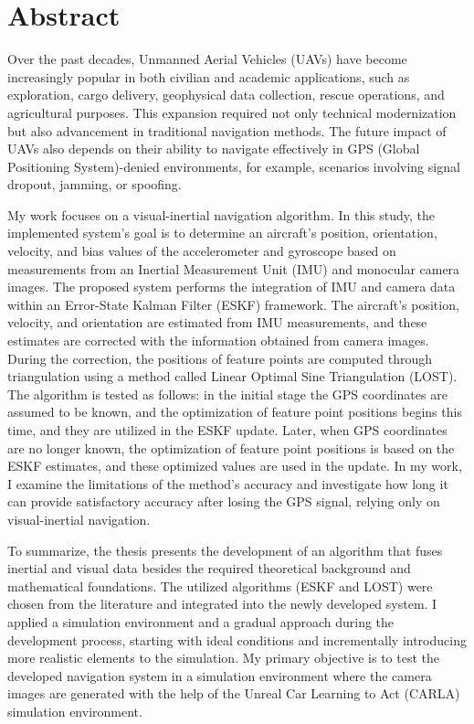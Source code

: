 \selectthesislanguage%
\chapter*{Abstract}

Over the past decades, Unmanned Aerial Vehicles (UAVs) have become increasingly popular in both civilian and academic applications, such as exploration, cargo delivery, geophysical data collection, rescue operations, and agricultural purposes. This expansion required not only technical modernization but also advancement in traditional navigation methods. The future impact of UAVs also depends on their ability to navigate effectively in GPS (Global Positioning System)-denied environments, for example, scenarios involving signal dropout, jamming, or spoofing.

My work focuses on a visual-inertial navigation algorithm. In this study, the implemented system's goal is to determine an aircraft's position, orientation, velocity, and bias values of the accelerometer and gyroscope based on measurements from an Inertial Measurement Unit (IMU) and monocular camera images. The proposed system performs the integration of IMU and camera data within an Error-State Kalman Filter (ESKF) framework. The aircraft's position, velocity, and orientation are estimated from IMU measurements, and these estimates are corrected with the information obtained from camera images. During the correction, the positions of feature points are computed through triangulation using a method called Linear Optimal Sine Triangulation (LOST). The algorithm is tested as follows: in the initial stage the GPS coordinates are assumed to be known, and the optimization of feature point positions begins this time, and they are utilized in the ESKF update. Later, when GPS coordinates are no longer known, the optimization of feature point positions is based on the ESKF estimates, and these optimized values are used in the update. In my work, I examine the limitations of the method's accuracy and investigate how long it can provide satisfactory accuracy after losing the GPS signal, relying only on visual-inertial navigation.

To summarize, the thesis presents the development of an algorithm that fuses inertial and visual data besides the required theoretical background and mathematical foundations. The utilized algorithms (ESKF and LOST) were chosen from the literature and integrated into the newly developed system. I applied a simulation environment and a gradual approach during the development process, starting with ideal conditions and incrementally introducing more realistic elements to the simulation. My primary objective is to test the developed navigation system in a simulation environment where the camera images are generated with the help of the Unreal Car Learning to Act (CARLA) simulation environment.
